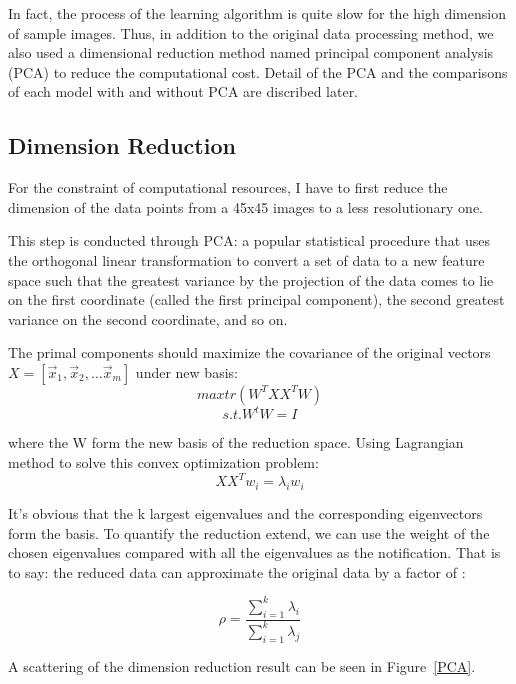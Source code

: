 \documentclass{article}
\begin{document}
In fact, the process of the learning algorithm is quite slow for the high dimension of sample images. Thus, in addition to the original data processing method, we also
used a dimensional reduction method named principal component analysis (PCA) to reduce the computational cost. Detail of the PCA and the comparisons of each model with and without PCA are discribed later.

\subsection{Dimension Reduction}


For the constraint of computational resources, I have to first reduce the dimension of the data points from a 45x45 images to a less resolutionary one.

This step is conducted through PCA: a popular statistical procedure that uses the orthogonal linear transformation to convert a set of data to a new feature space such that the greatest variance by the projection of the data comes to lie on the first coordinate (called the first principal component), the second greatest variance on the second coordinate, and so on.

The primal components should maximize the covariance of the original vectors $X = [\vec x_1, \vec x_2, ...\vec x_m]$ under new basis:
\begin{equation}
max tr(W^T X X^T W)
\end{equation}
\[
s.t. W^t W=I
\]

where the W form the new basis of the reduction space. Using Lagrangian method to solve this convex optimization problem:
\begin{equation}
X X^T w_i = \lambda_i w_i
\end{equation}

It’s obvious that the k largest eigenvalues and the corresponding eigenvectors form the basis. To quantify the reduction extend, we can use the weight of the chosen eigenvalues compared with all the eigenvalues as the notification. That is to say: the reduced data can approximate the
original data by a factor of : 

\begin{equation}
\rho = \frac{\sum_{i=1}^{k} \lambda_i}{\sum_{i=1}^{k} \lambda_j}
\end{equation}

A scattering of the dimension reduction result can be seen in Figure~\ref{PCA}.
\end{document}
